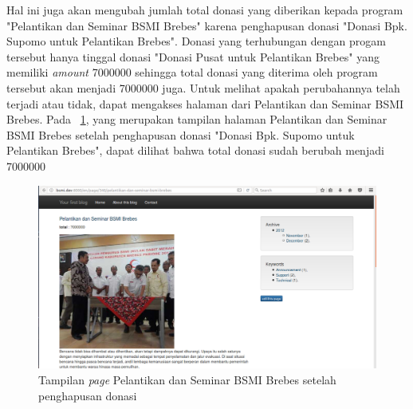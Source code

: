 Hal ini juga akan mengubah jumlah total donasi yang diberikan kepada program "Pelantikan dan Seminar BSMI Brebes" karena penghapusan donasi "Donasi Bpk. Supomo untuk Pelantikan Brebes". Donasi yang terhubungan dengan progam tersebut hanya tinggal donasi "Donasi Pusat untuk Pelantikan Brebes" yang memiliki \textit{amount} 7000000 sehingga total donasi yang diterima oleh program tersebut akan menjadi 7000000 juga. Untuk melihat apakah perubahannya telah terjadi atau tidak, dapat mengakses halaman dari Pelantikan dan Seminar BSMI Brebes. Pada \pic~\ref{fig:viewprogram4}, yang merupakan tampilan halaman Pelantikan dan Seminar BSMI Brebes setelah penghapusan donasi "Donasi Bpk. Supomo untuk Pelantikan Brebes", dapat dilihat bahwa total donasi sudah berubah menjadi 7000000
\begin{figure}
	\centering
	\includegraphics[width=1\textwidth]
	{pics/24-viewProgram.png}
	\caption{Tampilan \textit{page} Pelantikan dan Seminar BSMI Brebes setelah penghapusan donasi}
	\label{fig:viewprogram4}
\end{figure}
\vspace{-0.3cm}

